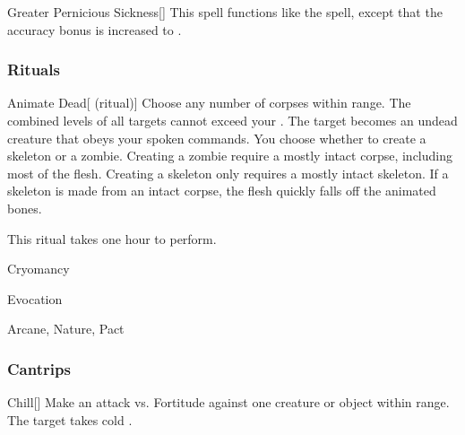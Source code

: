 \lowercase{\hypertarget{spell:Greater Pernicious Sickness}{}}\label{spell:Greater Pernicious Sickness}
\begin{apability}[\nth{5}]{\hypertarget{spell:Greater Pernicious Sickness}{Greater Pernicious Sickness}}[]
This spell functions like the  spell, except that the accuracy bonus is increased to .
\end{apability}
\vspace{0.25em}



\subsubsection{Rituals}


\lowercase{\hypertarget{spell:Animate Dead}{}}\label{spell:Animate Dead}
\begin{attuneability}[\nth{2}]{\hypertarget{spell:Animate Dead}{Animate Dead}}[ (ritual)]
Choose any number of corpses within \rngclose range.
The combined levels of all targets cannot exceed your .
The target becomes an undead creature that obeys your spoken commands.
You choose whether to create a skeleton or a zombie.
Creating a zombie require a mostly intact corpse, including most of the flesh.
Creating a skeleton only requires a mostly intact skeleton.
If a skeleton is made from an intact corpse, the flesh quickly falls off the animated bones.

This ritual takes one hour to perform.
\end{attuneability}
\vspace{0.25em}


\newpage
\begin{spellsection}{Cryomancy}

\begin{spellheader}
\end{spellheader}


 Evocation

 Arcane, Nature, Pact

\subsubsection{Cantrips}


\begin{freeability}{Chill}[]
Make an attack vs. Fortitude against one creature or object within \rngmed range.
\hit The target takes cold .
\end{freeability}

\end{spellsection}


